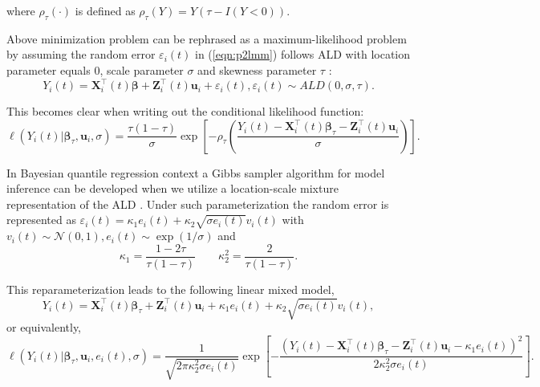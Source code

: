 \noindent where $\rho_{\tau}(\cdot)$ is defined as $\rho_{\tau}(Y)=Y(\tau-{I}{(Y<0)}).$

Above minimization problem can be rephrased as a maximum-likelihood problem by assuming the random error $\varepsilon_{i}(t)$ in (\ref{eqn:p2lmm}) follows ALD with location parameter equals 0, scale parameter $\sigma$ and skewness parameter $\tau$ \citep{koenker1999goodness,yu2001bayesian}:
\begin{equation*}
Y_{i}(t) ={\boldsymbol X}_{i}^{\top}(t) \boldsymbol{\beta}+ {\boldsymbol Z}_{i}^{\top}(t)\boldsymbol{u}_i + \varepsilon_{i}(t), \varepsilon_{i}(t)\sim ALD(0, \sigma, \tau).
\end{equation*}

This becomes clear when writing out the conditional likelihood function:
\begin{equation*}\label{eqn:p2ald_lqmm}
\ell(Y_{i}(t)|\boldsymbol{\beta}_{\tau},\boldsymbol{u}_i,\sigma)=\frac{\tau(1-\tau)}{\sigma}\exp\left[-\rho_{\tau}\left(\frac{Y_{i}(t)-{\boldsymbol X}_{i}^{\top}(t)\boldsymbol{\beta}_{\tau}-{\boldsymbol Z}_{i}^{\top}(t)\boldsymbol{u}_i}{\sigma}\right)\right].
\end{equation*}

In Bayesian quantile regression context a Gibbs sampler algorithm for model inference can be developed when we utilize a location-scale mixture representation of the ALD \citep{kotz2001laplace}. Under such parameterization the random error is represented as $\varepsilon_{i}(t)=\kappa_1e_{i}(t)+\kappa_2\sqrt{\sigma e_{i}(t)}v_{i}(t)$ with $v_{i}(t)\sim \mathcal{N}(0,1), e_{i}(t)\sim\exp(1/\sigma)$ and
\[\kappa_1=\frac{1-2\tau}{\tau(1-\tau)}\hspace{2em} \kappa_2^2=\frac{2}{\tau(1-\tau)}.\]


This reparameterization leads to the following linear mixed model,
\begin{equation*}\label{eqn:p2reformald2}
Y_{i}(t)={\boldsymbol X}_{i}^{\top}(t)\boldsymbol{\beta}_{\tau}+{\boldsymbol Z}_{i}^{\top}(t)\boldsymbol{u}_i+\kappa_1e_{i}(t)+\kappa_2\sqrt{\sigma e_{i}(t)}v_{i}(t),
\end{equation*}
\noindent or equivalently,
{\small
\begin{equation}\label{eqn:p2lo_sc_lh}
\ell(Y_{i}(t)|\boldsymbol{\beta}_{\tau},\boldsymbol{u}_i,e_{i}(t),\sigma)=\frac{1}{\sqrt{2\pi\kappa_2^2\sigma e_{i}(t)}}\exp\left[-\frac{(Y_{i}(t)-{\boldsymbol X}_{i}^{\top}(t)\boldsymbol{\beta}_{\tau}-{\boldsymbol Z}_{i}^{\top}(t)\boldsymbol{u}_i-\kappa_1e_{i}(t))^2}{2\kappa_2^2\sigma e_{i}(t)}\right].
\end{equation}
}


